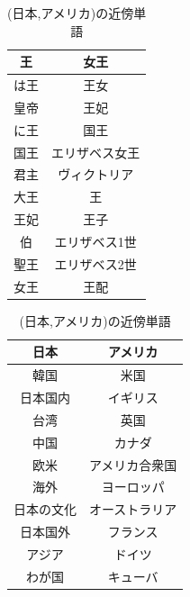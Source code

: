\begin{table}[h]
  \begin{minipage}[t]{.45\textwidth}
    \caption[(王,女王)]{(王,女王)の近傍単語}
    \label{kq_table}
    \begin{center}
      \begin{tabular}{|c|c|} \hline
        王 & 女王 \\ \hline
        は王 & 王女 \\
        皇帝 & 王妃 \\
        に王 & 国王 \\
        国王 & エリザベス女王 \\
        君主 & ヴィクトリア \\
        大王 & 王 \\
        王妃 & 王子 \\
        伯 & エリザベス1世 \\
        聖王 & エリザベス2世 \\
        女王 & 王配 \\ \hline
      \end{tabular}
    \end{center}
  \end{minipage}
  \hfill
  \begin{minipage}[t]{.45\textwidth}
    \caption[(日本,アメリカ)]{(日本,アメリカ)の近傍単語}
    \begin{center}
      \begin{tabular}{|c|c|} \hline
        日本 & アメリカ \\ \hline
        韓国 & 米国 \\
        日本国内 & イギリス \\
        台湾 & 英国 \\
        中国 & カナダ \\
        欧米 & アメリカ合衆国 \\
        海外 & ヨーロッパ \\
        日本の文化 & オーストラリア \\
        日本国外 & フランス \\
        アジア & ドイツ \\
        わが国 & キューバ \\ \hline
      \end{tabular}
    \end{center}
  \end{minipage}
\end{table}

\newpage

